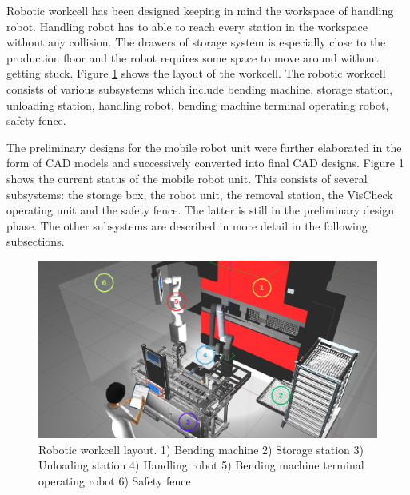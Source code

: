
Robotic workcell has been designed keeping in mind the workspace of handling robot. Handling robot has to able to reach every station in the workspace without any collision. The drawers of storage system is especially close to the production floor and the robot requires
some space to move around without getting stuck. Figure \ref{fig:robotic-workcell} shows the layout of the workcell. The robotic workcell consists of various subsystems which include bending machine, storage station, unloading station, handling robot, bending machine terminal operating robot, safety fence.



The preliminary designs for the mobile robot unit were further elaborated
in the form of CAD models and successively converted into final CAD designs. Figure 1 shows the
current status of the mobile robot unit. This consists of several subsystems: the storage box, the robot
unit, the removal station, the VisCheck operating unit and the safety fence. The latter is still in the
preliminary design phase. The other subsystems are described in more detail in the following
subsections.

\begin{figure}[h]
    \centering
    \includegraphics[width=\textwidth]{figures/robotic-workcell1.png}
    \caption{Robotic workcell layout. 1) Bending machine 2) Storage station 3) Unloading station 4) Handling robot 5) Bending machine terminal operating robot 6) Safety fence}
    \label{fig:robotic-workcell}
\end{figure}

